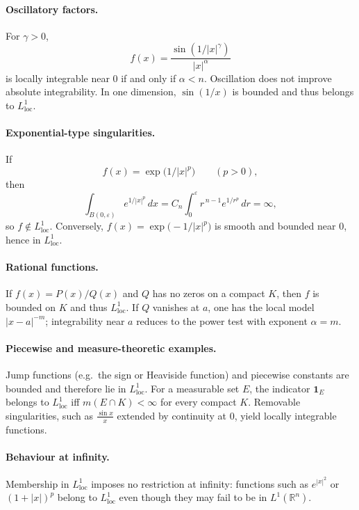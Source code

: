 \documentclass[12pt,a4paper]{article}
\theoremstyle{plain}
\theoremstyle{definition}
\theoremstyle{remark}
\theoremstyle{remark}
\begin{document}
\bigskip

\paragraph{Oscillatory factors.}
For $\gamma>0$,
\[
f(x)=\frac{\sin(1/|x|^\gamma)}{|x|^\alpha}
\]
is locally integrable near $0$ if and only if $\alpha<n$.
Oscillation does not improve absolute integrability. In one dimension, $\sin(1/x)$ is bounded and thus belongs to $L^1_{\mathrm{loc}}$.

\bigskip

\paragraph{Exponential-type singularities.}
If
\[
f(x)=\exp\!\big(1/|x|^p\big)\qquad (p>0),
\]
then
\[
\int_{B(0,\varepsilon)} e^{1/|x|^p}\,dx
= C_n\!\int_0^\varepsilon r^{\,n-1} e^{1/r^p}\,dr=\infty,
\]
so $f\notin L^1_{\mathrm{loc}}$.
Conversely, $f(x)=\exp\!\big(-1/|x|^p\big)$ is smooth and bounded near $0$, hence in $L^1_{\mathrm{loc}}$.

\bigskip

\paragraph{Rational functions.}
If $f(x)=P(x)/Q(x)$ and $Q$ has no zeros on a compact $K$, then $f$ is bounded on $K$ and thus $L^1_{\mathrm{loc}}$.
If $Q$ vanishes at $a$, one has the local model $|x-a|^{-m}$; integrability near $a$ reduces to the power test with exponent $\alpha=m$.

\bigskip

\paragraph{Piecewise and measure-theoretic examples.}
Jump functions (e.g.\ the sign or Heaviside function) and piecewise constants are bounded and therefore lie in $L^1_{\mathrm{loc}}$.
For a measurable set $E$, the indicator $\mathbf 1_E$ belongs to $L^1_{\mathrm{loc}}$ iff $m(E\cap K)<\infty$ for every compact $K$.
Removable singularities, such as $\frac{\sin x}{x}$ extended by continuity at $0$, yield locally integrable functions.

\bigskip

\paragraph{Behaviour at infinity.}
Membership in $L^1_{\mathrm{loc}}$ imposes no restriction at infinity: functions such as $e^{|x|^2}$ or $(1+|x|)^p$ belong to $L^1_{\mathrm{loc}}$ even though they may fail to be in $L^1(\mathbb R^n)$.
\end{document}
